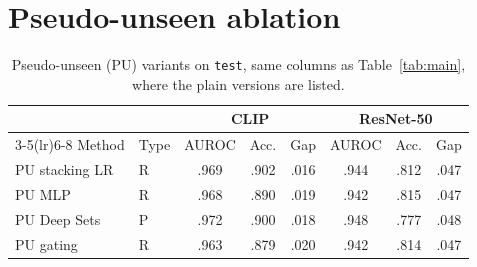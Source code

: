 \documentclass[10pt,a4paper]{article}
\begin{document}
\section{Pseudo-unseen ablation}\label{app:pu}
\begin{table}[H]
\centering
\small
\setlength{\tabcolsep}{5pt}
\begin{tabular}{llcccccc}
\toprule
 & & \multicolumn{3}{c}{CLIP} & \multicolumn{3}{c}{ResNet-50} \\
\cmidrule(lr){3-5}\cmidrule(lr){6-8}
Method & Type & AUROC & Acc. & Gap & AUROC & Acc. & Gap \\
\midrule
PU stacking LR & R & .969 & .902 & .016 & .944 & .812 & .047 \\
PU MLP & R & .968 & .890 & .019 & .942 & .815 & .047 \\
PU Deep Sets & P & .972 & .900 & .018 & .948 & .777 & .048 \\
PU gating & R & .963 & .879 & .020 & .942 & .814 & .047 \\
\bottomrule
\end{tabular}
\caption{Pseudo-unseen (PU) variants on \texttt{test}, same columns as Table~\ref{tab:main}, where the plain versions are listed.}
\label{tab:pu}
\end{table}
\end{document}
